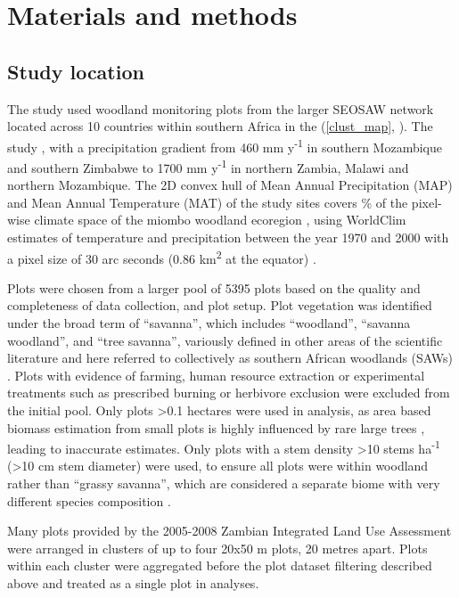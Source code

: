 \documentclass[11pt,a4paper]{article}
\newcommand{\textapprox}{\raisebox{0.5ex}{\texttildelow}}  %
\begin{document}
\section{Materials and methods}

\subsection{Study location}

The study used \nplots{} woodland monitoring plots from the larger SEOSAW network \citep{seosaw_web} located across 10 countries within southern Africa in the  (\autoref{clust_map}, \citealt{White1987}). The study , with a precipitation gradient from \textapprox{}460 mm y\textsuperscript{-1} in southern Mozambique and southern Zimbabwe to \textapprox{}1700 mm y\textsuperscript{-1} in northern Zambia, Malawi and northern Mozambique. The 2D convex hull of Mean Annual Precipitation (MAP) and Mean Annual Temperature (MAT) of the study sites covers \hullcover{}\% of the pixel-wise climate space of the miombo woodland ecoregion  \citep{White1987}, using WorldClim estimates of temperature and precipitation between the year 1970 and 2000 with a pixel size of 30 arc seconds (0.86 km\textsuperscript{2} at the equator) \citep{Fick2017}. 

Plots were chosen from a larger pool of 5395 plots based on the quality and completeness of data collection, and plot setup. Plot vegetation was identified under the broad term of ``savanna'', which includes ``woodland'', ``savanna woodland'', and ``tree savanna'', variously defined in other areas of the scientific literature and here referred to collectively as southern African woodlands (SAWs) \citep{Ratnam2011, Hill2010}. Plots with evidence of farming, human resource extraction or experimental treatments such as prescribed burning or herbivore exclusion were excluded from the initial pool. Only plots >0.1 hectares were used in analysis, as area based biomass estimation from small plots is highly influenced by rare large trees \citep{Stegen2011}, leading to inaccurate estimates. Only plots with a stem density >10 stems ha\textsuperscript{-1} (>10 cm stem diameter) were used, to ensure all plots were within woodland rather than ``grassy savanna'', which are considered a separate biome with very different species composition \citep{Parr2014}. 

Many plots provided by the 2005-2008 Zambian Integrated Land Use Assessment \citep{Mukosha2009} were arranged in clusters of up to four 20x50 m plots, 20 metres apart. Plots within each cluster were aggregated before the plot dataset filtering described above and treated as a single plot in analyses.
\end{document}
